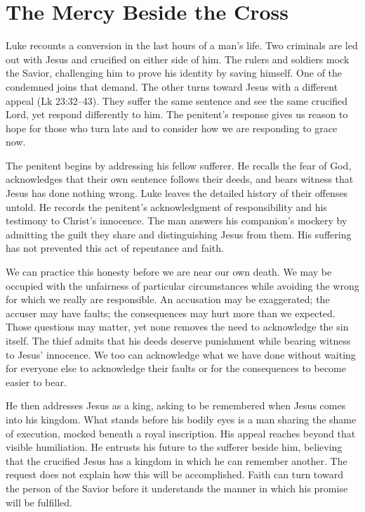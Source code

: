 \section{The Mercy Beside the Cross}

Luke recounts a conversion in the last hours of a man's life. Two criminals are led out with Jesus and crucified on either side of him. The rulers and soldiers mock the Savior, challenging him to prove his identity by saving himself. One of the condemned joins that demand. The other turns toward Jesus with a different appeal (Lk 23:32--43). They suffer the same sentence and see the same crucified Lord, yet respond differently to him. The penitent's response gives us reason to hope for those who turn late and to consider how we are responding to grace now.

The penitent begins by addressing his fellow sufferer. He recalls the fear of God, acknowledges that their own sentence follows their deeds, and bears witness that Jesus has done nothing wrong. Luke leaves the detailed history of their offenses untold. He records the penitent's acknowledgment of responsibility and his testimony to Christ's innocence. The man answers his companion's mockery by admitting the guilt they share and distinguishing Jesus from them. His suffering has not prevented this act of repentance and faith.

We can practice this honesty before we are near our own death. We may be occupied with the unfairness of particular circumstances while avoiding the wrong for which we really are responsible. An accusation may be exaggerated; the accuser may have faults; the consequences may hurt more than we expected. Those questions may matter, yet none removes the need to acknowledge the sin itself. The thief admits that his deeds deserve punishment while bearing witness to Jesus' innocence. We too can acknowledge what we have done without waiting for everyone else to acknowledge their faults or for the consequences to become easier to bear.

He then addresses Jesus as a king, asking to be remembered when Jesus comes into his kingdom. What stands before his bodily eyes is a man sharing the shame of execution, mocked beneath a royal inscription. His appeal reaches beyond that visible humiliation. He entrusts his future to the sufferer beside him, believing that the crucified Jesus has a kingdom in which he can remember another. The request does not explain how this will be accomplished. Faith can turn toward the person of the Savior before it understands the manner in which his promise will be fulfilled.

